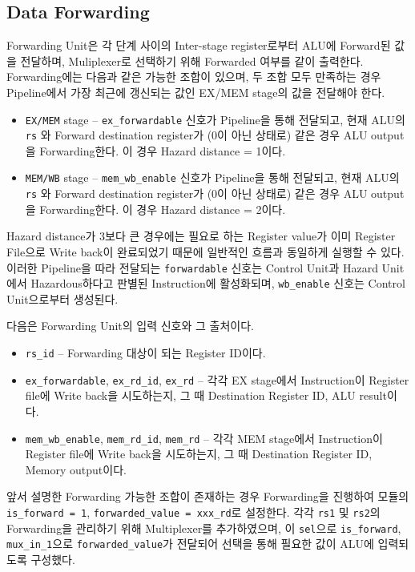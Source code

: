 \documentclass{scrartcl}
\begin{document}
\subsection{Data Forwarding}
Forwarding Unit은 각 단계 사이의 Inter-stage register로부터 ALU에 Forward된 값을 전달하며, Muliplexer로 선택하기 위해 Forwarded 여부를 같이 출력한다.
Forwarding에는 다음과 같은 가능한 조합이 있으며, 두 조합 모두 만족하는 경우 Pipeline에서 가장 최근에 갱신되는 값인 EX/MEM stage의 값을 전달해야 한다.
\begin{itemize}
  \item \texttt{EX/MEM} stage -- \texttt{ex\_forwardable} 신호가 Pipeline을 통해 전달되고, 현재 ALU의 \texttt{rs} 와 Forward destination register가 (0이 아닌 상태로) 같은 경우 ALU output을 Forwarding한다. 이 경우 Hazard distance = 1이다.
  \item \texttt{MEM/WB} stage -- \texttt{mem\_wb\_enable} 신호가 Pipeline을 통해 전달되고, 현재 ALU의 \texttt{rs} 와 Forward destination register가 (0이 아닌 상태로) 같은 경우 ALU output을 Forwarding한다. 이 경우 Hazard distance = 2이다.
\end{itemize}

Hazard distance가 3보다 큰 경우에는 필요로 하는 Register value가 이미 Register File으로 Write back이 완료되었기 때문에 일반적인 흐름과 동일하게 실행할 수 있다.
이러한 Pipeline을 따라 전달되는 \texttt{forwardable} 신호는 Control Unit과 Hazard Unit에서 Hazardous하다고 판별된 Instruction에 활성화되며, \texttt{wb\_enable} 신호는 Control Unit으로부터 생성된다.

다음은 Forwarding Unit의 입력 신호와 그 출처이다.
\begin{itemize}
  \item \texttt{rs\_id} -- Forwarding 대상이 되는 Register ID이다.
  \item \texttt{ex\_forwardable}, \texttt{ex\_rd\_id}, \texttt{ex\_rd} -- 각각 EX stage에서 Instruction이 Register file에 Write back을 시도하는지, 그 때 Destination Register ID, ALU result이다.
  \item \texttt{mem\_wb\_enable}, \texttt{mem\_rd\_id}, \texttt{mem\_rd} -- 각각 MEM stage에서 Instruction이 Register file에 Write back을 시도하는지, 그 때 Destination Register ID, Memory output이다.
\end{itemize}

앞서 설명한 Forwarding 가능한 조합이 존재하는 경우 Forwarding을 진행하여 모듈의 \texttt{is\_forward = 1}, \texttt{forwarded\_value = xxx\_rd}로 설정한다.
각각 \texttt{rs1} 및 \texttt{rs2}의 Forwarding을 관리하기 위해 Multiplexer를 추가하였으며, 이 \texttt{sel}으로 \texttt{is\_forward},
\texttt{mux\_in\_1}으로 \texttt{forwarded\_value}가 전달되어 선택을 통해 필요한 값이 ALU에 입력되도록 구성했다.
\end{document}
